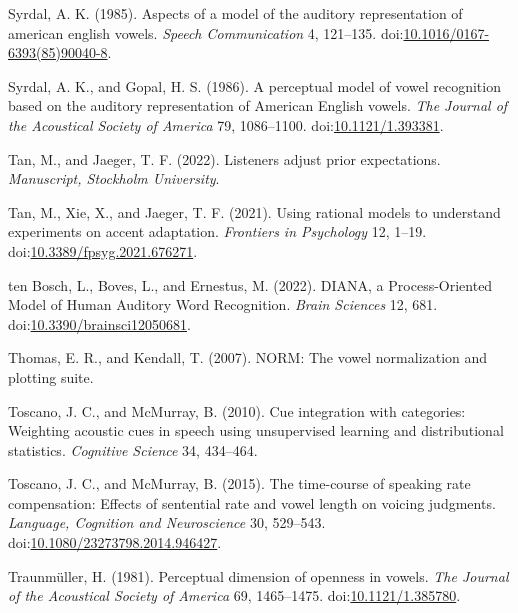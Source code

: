 \documentclass[utf8]{frontiersSCNS}
\newlength{\cslhangindent}
\newlength{\cslentryspacingunit} %
\newenvironment{CSLReferences}[2] %
 {%
  \setlength{\parindent}{0pt}
  \ifodd #1
  \let\oldpar\par
  \def\par{\hangindent=\cslhangindent\oldpar}
  \fi
  \setlength{\parskip}{#2\cslentryspacingunit}
 }%
 {}
\begin{document}
\begin{CSLReferences}{1}{0}
\leavevmode{}%
Syrdal, A. K. (1985). Aspects of a model of the auditory representation of american english vowels. \emph{Speech Communication} 4, 121--135. doi:\href{https://doi.org/10.1016/0167-6393(85)90040-8}{10.1016/0167-6393(85)90040-8}.

\leavevmode{}%
Syrdal, A. K., and Gopal, H. S. (1986). A perceptual model of vowel recognition based on the auditory representation of {American English} vowels. \emph{The Journal of the Acoustical Society of America} 79, 1086--1100. doi:\href{https://doi.org/10.1121/1.393381}{10.1121/1.393381}.

\leavevmode{}%
Tan, M., and Jaeger, T. F. (2022). Listeners adjust prior expectations. \emph{Manuscript, Stockholm University}.

\leavevmode{}%
Tan, M., Xie, X., and Jaeger, T. F. (2021). Using rational models to understand experiments on accent adaptation. \emph{Frontiers in Psychology} 12, 1--19. doi:\href{https://doi.org/10.3389/fpsyg.2021.676271}{10.3389/fpsyg.2021.676271}.

\leavevmode{}%
ten Bosch, L., Boves, L., and Ernestus, M. (2022). {DIANA}, a {Process-Oriented Model} of {Human Auditory Word Recognition}. \emph{Brain Sciences} 12, 681. doi:\href{https://doi.org/10.3390/brainsci12050681}{10.3390/brainsci12050681}.

\leavevmode{}%
Thomas, E. R., and Kendall, T. (2007). {NORM}: {The} vowel normalization and plotting suite.

\leavevmode{}%
Toscano, J. C., and McMurray, B. (2010). Cue integration with categories: {Weighting} acoustic cues in speech using unsupervised learning and distributional statistics. \emph{Cognitive Science} 34, 434--464.

\leavevmode{}%
Toscano, J. C., and McMurray, B. (2015). The time-course of speaking rate compensation: Effects of sentential rate and vowel length on voicing judgments. \emph{Language, Cognition and Neuroscience} 30, 529--543. doi:\href{https://doi.org/10.1080/23273798.2014.946427}{10.1080/23273798.2014.946427}.

\leavevmode{}%
Traunmüller, H. (1981). Perceptual dimension of openness in vowels. \emph{The Journal of the Acoustical Society of America} 69, 1465--1475. doi:\href{https://doi.org/10.1121/1.385780}{10.1121/1.385780}.


\end{CSLReferences}
\end{document}
